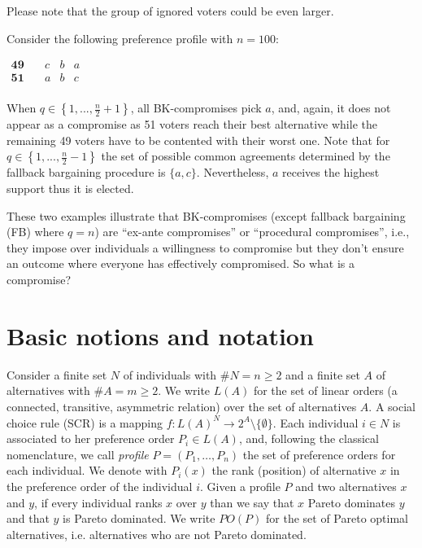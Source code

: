 \documentclass[version=3.21, pagesize, notitlepage, twoside=off, bibliography=totoc, DIV=calc, fontsize=12pt, a4paper]{scrartcl}
\newcommand{\paretopt}{\mathit{PO}}
\begin{document}
Please note that the group of ignored voters could be even larger.
\begin{example}
	Consider the following preference profile with $n=100$:
	\begin{center}
		$
		\begin{array}{cccc}
		\mathbf{49} \quad &c&b&a\\
		\mathbf{51} \quad &a&b&c\\
		\end{array}
		$
	\end{center}
	When $q\in \left\{ 1,..., \frac{n}{2} +1\right\} $, all BK-compromises pick $a$, and, again, it does not appear as a compromise as 51 voters reach their best alternative while the remaining 49 voters have to be contented with their worst one. Note that for $q\in \left\{ 1,..., \frac{n}{2} -1 \right\} $ the set of possible common agreements determined by the fallback bargaining procedure is $\{a,c\}$. Nevertheless, $a$ receives the highest support thus it is elected.
\end{example}

These two examples illustrate that BK-compromises (except fallback bargaining (FB) where $q=n$) are “ex-ante compromises” or “procedural compromises”, i.e., they impose over individuals a willingness to compromise but they don't ensure an outcome where everyone has effectively compromised. So what is a compromise?


\section{Basic notions and notation}
Consider a finite set $N$ of individuals with $\#N=n\geq 2$ and a finite set $A$ of alternatives with $\#A=m\geq 2$. We write $L(A)$ for the set of linear orders (a connected, transitive, asymmetric relation) over the set of alternatives $A$. A social choice rule (SCR) is a mapping $f:L(A)^{N}\rightarrow 2^{A} \setminus \{\emptyset \}$. Each individual $i \in N$ is associated to her preference order $P_{i} \in L(A)$, and, following the classical nomenclature, we call {\em profile} $P=(P_1, \dots, P_n)$ the set of preference orders for each individual. We denote with $P_i(x)$ the rank (position) of alternative $x$ in the preference order of the individual $i$. Given a profile $P$ and two alternatives $x$ and $y$, if every individual ranks $x$ over $y$ than we say that $x$ Pareto dominates $y$ and that $y$ is Pareto dominated. We write $\paretopt(P)$ for the set of Pareto optimal alternatives, i.e. alternatives who are not Pareto dominated. 
\end{document}
